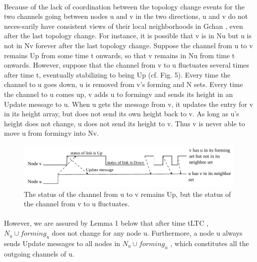 \paragraph{}Because of the lack of coordination between the topology change events for the two channels going between nodes u and v in the two directions, u and v do not neces-sarily have consistent views of their local neighborhoods in Gchan , even after the last topology change. For instance, it is possible that v is in Nu but u is not in Nv forever after the last topology change. Suppose the channel from u to v remains Up from some time t onwards, so that v remains in Nu from time t onwards. However, suppose that the channel from v to u fluctuates several times after time t, eventually stabilizing to being Up (cf. Fig. 5). Every time the channel to u goes down, u is removed from v's forming and N sets. Every time the channel to u comes up, v adds u to formingv and sends its height in an Update message to u. When u gets the message from v, it updates the entry for v in its height array, but does not send its own height back to v. As long as u's height does not change, u does not send its height to v. Thus v is never able to move u from formingv into Nv.
\begin{figure}[h]
	\centering
	\includegraphics[width=1\linewidth]{fig_1}
	\caption[The status of the channel from u to v remains Up, but the status of the channel from v to u fluctuates.]{The status of the channel from u to v remains Up, but the status of the channel from v to u fluctuates.}
	\label{fig:fig1}
\end{figure}
\paragraph{}However, we are assured by Lemma 1 below that after time tLTC , $N_u \cup forming_u$ does not change for any node u. Furthermore, a node u always sends Update messages to all nodes in $N_u \cup forming_u$ , which constitutes all the outgoing channels of u.
